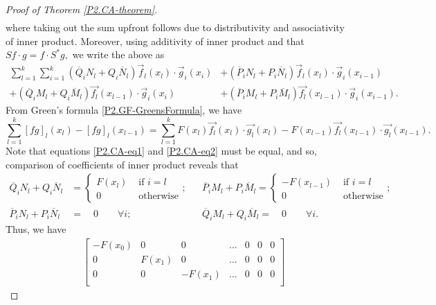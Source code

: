 \documentclass[10pt,reqno,oneside,a4paper]{article}
\begin{document}
\begin{proof}[Proof of Theorem \ref{P2.CA-theorem}]
\begin{align*}
\end{align*}
where taking out the sum upfront follows due to distributivity and associativity of inner product. Moreover, using additivity of inner product and that $S f \cdot g = f \cdot S^* g,$ we write the above as
\begin{equation}\label{P2.CA-eq1}
\begin{aligned}
\sum^k_{l=1} \sum^k_{i=1} (\overline{Q}_i N_l + Q_i \overline{N}_l)  \vec{f}_l(x_l)  \cdot  \vec{g}_i(x_i) &+  (\overline{P}_i N_l  + P_i\overline{N}_l ) \vec{f}_l(x_l)  \cdot  \vec{g}_i(x_{i-1}) \\
+   (\overline{Q}_i  M_l +Q_i \overline{M}_l) \vec{f_l}(x_{l-1}) \cdot\vec{g}_i(x_i) &+  (\overline{P}_i M_l+P_i \overline{M}_l) \vec{f_l}(x_{l-1}) \cdot  \vec{g}_i(x_{i-1}). 
\end{aligned}
\end{equation}
From Green's formula \eqref{P2.GF-GreensFormula}, we have
\begin{equation}\label{P2.CA-eq2}
\sum^k_{l=1}  [fg]_l(x_l) - [fg]_l(x_{l-1}) = \sum^k_{l=1}  F(x_l) \vec{f_l}(x_l) \cdot \vec{g_l}(x_l) - F(x_{l-1}) \vec{f_l}(x_{l-1}) \cdot \vec{g_l}(x_{l-1}). 
\end{equation}
Note that equations \eqref{P2.CA-eq1} and \eqref{P2.CA-eq2} must be equal, and so, comparison of coefficients of inner product reveals that 
\begin{align*}
\overline{Q}_i N_l + Q_i \overline{N}_l &= \begin{cases} F(x_l) &\mbox{ if } i = l  \\ 0 &\mbox{ otherwise} \end{cases}; && \overline{P}_i M_l+ P_i \overline{M}_l = \begin{cases} -F(x_{l-1}) &\mbox{ if } i = l  \\ 0 &\mbox{ otherwise} \end{cases}; \\
\overline{P}_i N_l  + P_i\overline{N}_l & = \quad 0 \qquad \forall i; && \overline{Q}_i M_l +Q_i \overline{M}_l = \quad 0 \qquad \forall i. 
\end{align*}
Thus, we have 
\begin{equation}\label{P2.CA-eq3}
\begin{aligned}
&\begin{bmatrix} 
- F(x_0) & 0 & 0 & \ldots & 0 & 0 & 0 \\
0 & F(x_1) & 0 & \ldots & 0 & 0 & 0 \\
0 &  0 & -F(x_1) & \ldots & 0 & 0 & 0 \\

\end{bmatrix}
\end{aligned}
\end{equation}
\end{proof}
\end{document}
